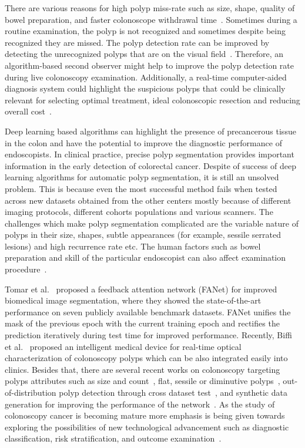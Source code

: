 \documentclass{article}
\begin{document}
There are various reasons for high polyp miss-rate such as size, shape, quality of bowel preparation, and faster colonoscope withdrawal time~\cite{ahn2012miss}. Sometimes during a routine examination, the polyp is not recognized and sometimes despite being recognized they are missed. The polyp detection rate can be improved by detecting the unrecognized polyps that are on the visual field~\cite{mahmud2015computer}. Therefore, an algorithm-based second observer might help to improve the polyp detection rate during live colonoscopy examination. Additionally, a real-time computer-aided diagnosis system could highlight the suspicious polyps that could be clinically relevant for selecting optimal treatment, ideal colonoscopic resection and reducing overall cost~\cite{rex2017colorectal}. 

Deep learning based algorithms can highlight the presence of precancerous tissue in the colon and have the potential to improve the diagnostic performance of endoscopists.  In clinical practice, precise polyp segmentation provides important information in the early detection of colorectal cancer. Despite of success of deep learning algorithms for automatic polyp segmentation, it is still an unsolved problem. This is because even the most successful method fails when tested across new datasets obtained from the other centers mostly because of different imaging protocols, different cohorts populations and various scanners. The challenges which make polyp segmentation complicated are the variable nature of polyps in their size, shapes, subtle appearances (for example, sessile serrated lesions) and high recurrence rate etc. The human factors such as bowel preparation and skill of the particular endoscopist can also affect examination procedure~\cite{jha2022machine}.


Tomar et al.~\cite{tomar2022fanet} proposed a feedback attention network (FANet) for improved biomedical image segmentation, where they showed the state-of-the-art performance on seven publicly available benchmark datasets. FANet unifies the mask of the previous epoch with the current training epoch and rectifies the prediction iteratively during test time for improved performance. Recently, Biffi et al.~\cite{biffi2022novel} proposed an intelligent medical device for real-time optical characterization of colonoscopy polyps which can be also integrated easily into clinics. Besides that, there are several recent works on colonoscopy targeting polyps attributes such as size and count~\cite{tomar2022tganet}, flat, sessile or diminutive polyps~\cite{jha2021comprehensive}, out-of-distribution polyp detection through cross dataset test~\cite{srivastava2022gmsrf,jha2021comprehensive}, and synthetic data generation for improving the performance of the network~\cite{fagereng2022polypconnect}. As the study of colonoscopy cancer is becoming mature more emphasis is being given towards exploring the possibilities of new technological advancement such as diagnostic classification, risk stratification, and outcome examination~\cite{diao2022computer}. 
\end{document}
